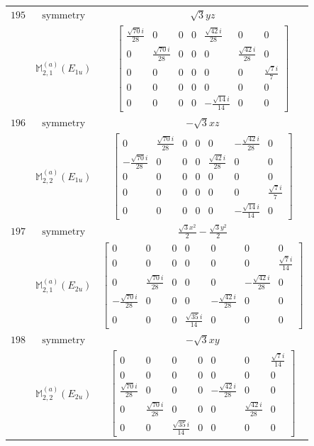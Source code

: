 \documentclass[fleqn,8pt,landscape]{jsarticle}
\begin{document}
\begin{longtable}{ccc}
$ 195 $ & $ \text{symmetry} $ & $ \sqrt{3} y z $ \\
$  $ & $ \mathbb{M}_{2,1}^{(a)}(E_{1u}) $ & $ \begin{bmatrix} \frac{\sqrt{70} i}{28} & 0 & 0 & 0 & \frac{\sqrt{42} i}{28} & 0 & 0 \\ 0 & \frac{\sqrt{70} i}{28} & 0 & 0 & 0 & \frac{\sqrt{42} i}{28} & 0 \\ 0 & 0 & 0 & 0 & 0 & 0 & \frac{\sqrt{7} i}{7} \\ 0 & 0 & 0 & 0 & 0 & 0 & 0 \\ 0 & 0 & 0 & 0 & - \frac{\sqrt{14} i}{14} & 0 & 0 \end{bmatrix} $ \\ \hline
$ 196 $ & $ \text{symmetry} $ & $ - \sqrt{3} x z $ \\
$  $ & $ \mathbb{M}_{2,2}^{(a)}(E_{1u}) $ & $ \begin{bmatrix} 0 & \frac{\sqrt{70} i}{28} & 0 & 0 & 0 & - \frac{\sqrt{42} i}{28} & 0 \\ - \frac{\sqrt{70} i}{28} & 0 & 0 & 0 & \frac{\sqrt{42} i}{28} & 0 & 0 \\ 0 & 0 & 0 & 0 & 0 & 0 & 0 \\ 0 & 0 & 0 & 0 & 0 & 0 & \frac{\sqrt{7} i}{7} \\ 0 & 0 & 0 & 0 & 0 & - \frac{\sqrt{14} i}{14} & 0 \end{bmatrix} $ \\ \hline
$ 197 $ & $ \text{symmetry} $ & $ \frac{\sqrt{3} x^{2}}{2} - \frac{\sqrt{3} y^{2}}{2} $ \\
$  $ & $ \mathbb{M}_{2,1}^{(a)}(E_{2u}) $ & $ \begin{bmatrix} 0 & 0 & 0 & 0 & 0 & 0 & 0 \\ 0 & 0 & 0 & 0 & 0 & 0 & \frac{\sqrt{7} i}{14} \\ 0 & \frac{\sqrt{70} i}{28} & 0 & 0 & 0 & - \frac{\sqrt{42} i}{28} & 0 \\ - \frac{\sqrt{70} i}{28} & 0 & 0 & 0 & - \frac{\sqrt{42} i}{28} & 0 & 0 \\ 0 & 0 & 0 & \frac{\sqrt{35} i}{14} & 0 & 0 & 0 \end{bmatrix} $ \\ \hline
$ 198 $ & $ \text{symmetry} $ & $ - \sqrt{3} x y $ \\
$  $ & $ \mathbb{M}_{2,2}^{(a)}(E_{2u}) $ & $ \begin{bmatrix} 0 & 0 & 0 & 0 & 0 & 0 & \frac{\sqrt{7} i}{14} \\ 0 & 0 & 0 & 0 & 0 & 0 & 0 \\ \frac{\sqrt{70} i}{28} & 0 & 0 & 0 & - \frac{\sqrt{42} i}{28} & 0 & 0 \\ 0 & \frac{\sqrt{70} i}{28} & 0 & 0 & 0 & \frac{\sqrt{42} i}{28} & 0 \\ 0 & 0 & \frac{\sqrt{35} i}{14} & 0 & 0 & 0 & 0 \end{bmatrix} $ \\ \hline

\end{longtable}
\end{document}
